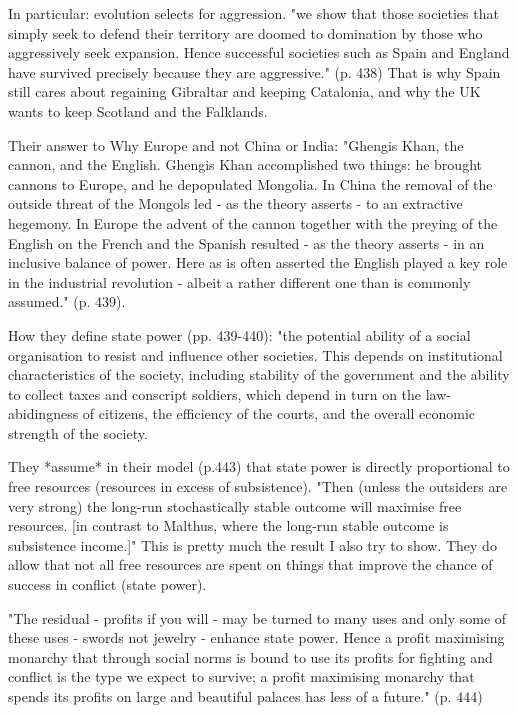 \documentclass{article}
\begin{document}
In particular: evolution selects for aggression. "we show that those societies that simply seek to defend their territory are doomed to domination by those who aggressively seek expansion. Hence successful societies such as Spain and England have survived precisely because they are aggressive." (p. 438) That is why Spain still cares about regaining Gibraltar and keeping Catalonia, and why the UK wants to keep Scotland and the Falklands.

Their answer to Why Europe and not China or India: "Ghengis Khan, the cannon, and the English. Ghengis Khan accomplished two things: he brought cannons to Europe, and he depopulated Mongolia. In China the removal of the outside threat of the Mongols led - as the theory asserts - to an extractive hegemony. In Europe the advent of the cannon together with the preying of the English on the French and the Spanish resulted - as the theory asserts - in an inclusive balance of power. Here as is often asserted the English played a key role in the industrial revolution - albeit a rather different one than is commonly assumed." (p. 439).


How they define state power (pp. 439-440): "the potential ability of a social organisation to resist and influence other societies. This depends on institutional characteristics of the society, including stability of the government and the ability to collect taxes and conscript soldiers, which depend in turn on the law-abidingness of citizens, the efficiency of the courts, and the overall economic strength of the society.

They *assume* in their model (p.443) that state power is directly proportional to free resources (resources in excess of subsistence).
"Then (unless the outsiders are very strong) the long-run stochastically stable outcome will maximise free resources. [in contrast to Malthus, where the long-run stable outcome is subsistence income.]" This is pretty much the result I also try to show. 
They do allow that not all free resources are spent on things that improve the chance of success in conflict (state power).

"The residual - profits if you will - may be turned to many uses and only some of these uses - swords not jewelry - enhance state power. Hence a profit maximising monarchy that through social norms is bound to use its profits for fighting and conflict is the type we expect to survive; a profit maximising monarchy that spends its profits on large and beautiful palaces has less of a future." (p. 444)
\end{document}

